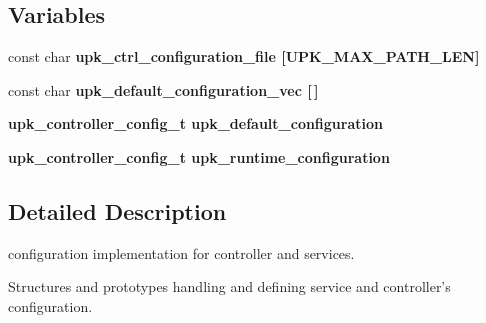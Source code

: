 \subsection*{Variables}
\begin{CompactItemize}
\item 
const char \bf{upk\_\-ctrl\_\-configuration\_\-file} [UPK\_\-MAX\_\-PATH\_\-LEN]
\item 
const char \bf{upk\_\-default\_\-configuration\_\-vec} [$\,$]
\item 
\bf{upk\_\-controller\_\-config\_\-t} \bf{upk\_\-default\_\-configuration}
\item 
\bf{upk\_\-controller\_\-config\_\-t} \bf{upk\_\-runtime\_\-configuration}
\end{CompactItemize}


\subsection{Detailed Description}
configuration implementation for controller and services. 

Structures and prototypes handling and defining service and controller's configuration. 
